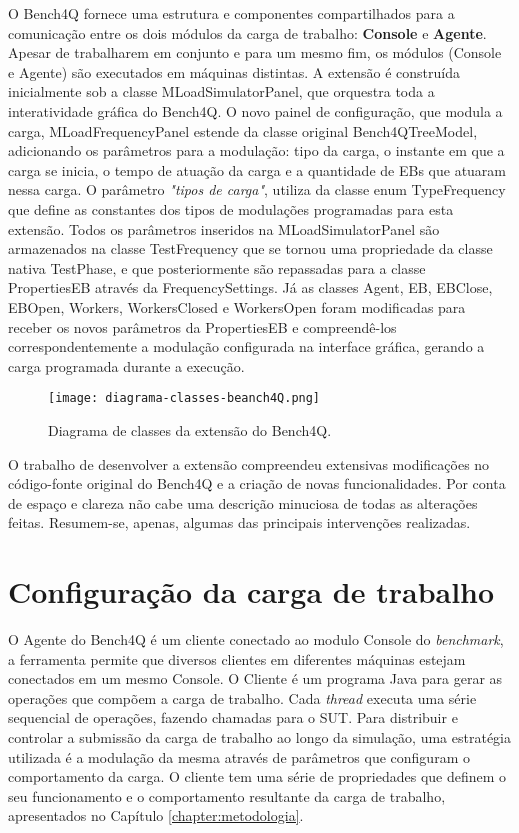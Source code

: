 O Bench4Q fornece uma estrutura e componentes compartilhados para a comunicação entre os dois módulos da carga de trabalho: \textbf{Console} e \textbf{Agente}. Apesar de trabalharem em conjunto e para um mesmo fim, os módulos (Console e Agente) são executados em máquinas distintas.  A extensão é construída inicialmente sob a classe \textsf{MLoadSimulatorPanel}, que orquestra toda a interatividade gráfica do Bench4Q. O novo painel de configuração, que modula a carga, \textsf{MLoadFrequencyPanel} estende da classe original \textsf{Bench4QTreeModel}, adicionando os parâmetros para a modulação: tipo da carga, o instante em que a carga se inicia, o tempo de atuação da carga e a quantidade de EBs que atuaram nessa carga. O parâmetro \textit{"tipos de carga"}, utiliza da classe enum \textsf{TypeFrequency} que define as constantes dos tipos de modulações programadas para esta extensão.  Todos os parâmetros inseridos na \textsf{MLoadSimulatorPanel} são armazenados na classe \textsf{TestFrequency} que se tornou uma propriedade da classe nativa \textsf{TestPhase}, e que posteriormente são repassadas para a classe \textsf{PropertiesEB} através da \textsf{FrequencySettings}. Já as classes \textsf{Agent}, \textsf{EB}, \textsf{EBClose}, \textsf{EBOpen}, \textsf{Workers}, \textsf{WorkersClosed} e \textsf{WorkersOpen} foram modificadas para receber os novos parâmetros da \textsf{PropertiesEB} e compreendê-los correspondentemente a modulação configurada na interface gráfica, gerando a carga programada durante a execução.
 
\begin{figure}[!htb]
	\centering
	\texttt{[image: diagrama-classes-beanch4Q.png]}	
	\caption{Diagrama de classes da extensão do Bench4Q.}
	\label{fig:diagrama-classes}
	\fautor
\end{figure}

O trabalho de desenvolver a extensão compreendeu extensivas modificações no código-fonte original do Bench4Q e a criação de novas funcionalidades. Por conta de espaço e clareza não cabe uma descrição minuciosa de todas as alterações feitas. Resumem-se, apenas, algumas das principais intervenções realizadas.

\section{Configuração da carga de trabalho}
O Agente do Bench4Q é um cliente conectado ao modulo Console do \textit{benchmark}, a ferramenta permite que diversos clientes em diferentes máquinas estejam conectados em um mesmo Console.
O Cliente é um programa Java para gerar as operações que compõem a carga de trabalho. Cada \textit{thread} executa uma série sequencial de operações, fazendo chamadas para o SUT. Para distribuir e controlar a submissão da carga de trabalho ao longo da simulação, uma estratégia utilizada é a modulação da mesma através de parâmetros que configuram o comportamento da carga. O cliente tem uma série de propriedades que definem o seu funcionamento e o comportamento resultante da carga de trabalho, apresentados no Capítulo \ref{chapter:metodologia}. 

